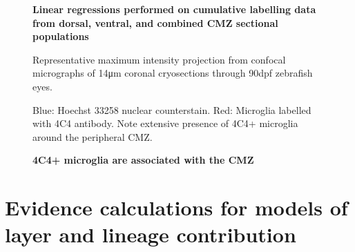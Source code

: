 \begin{figure}[!h]
    \caption{{\bf Linear regressions performed on cumulative labelling data from dorsal, ventral, and combined CMZ sectional populations}}
    \label{cumEdUlinreg}
\end{figure}

\begin{figure}[!h]
    \caption{{\bf 4C4+ microglia are associated with the CMZ}}
    Representative maximum intensity projection from confocal micrographs of 14\si{\micro\metre} coronal cryosections through 90dpf zebrafish eyes.
    
    Blue: Hoechst 33258 nuclear counterstain. Red: Microglia labelled with 4C4 antibody. Note extensive presence of 4C4+ microglia around the peripheral CMZ.
    \label{4C4micrograph}
\end{figure}

\FloatBarrier

\section{Evidence calculations for models of layer and lineage contribution}
\FloatBarrier

